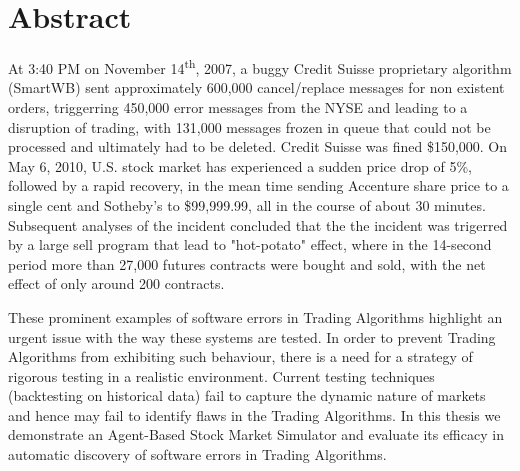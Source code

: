 \chapter*{Abstract}
At 3:40 PM on November 14\textsuperscript{th}, 2007, a buggy Credit Suisse proprietary algorithm (SmartWB) sent approximately 600,000 cancel/replace messages for non existent orders, triggerring 450,000 error messages from the NYSE and leading to a disruption of trading, with 131,000 messages frozen in queue that could not be processed and ultimately had to be deleted. Credit Suisse was fined \$150,000. On May 6, 2010, U.S. stock market has experienced a sudden price drop of 5\%, followed by a rapid recovery, in the mean time sending Accenture share price to a single cent and Sotheby’s to \$99,999.99, all in the course of about 30 minutes. Subsequent analyses of the incident concluded that the the incident was trigerred by a large sell program that lead to "hot-potato" effect, where in the 14-second period more than 27,000 futures contracts were bought and sold, with the net effect of only around 200 contracts. \cite{Kirilenko2011}

These prominent examples of software errors in Trading Algorithms highlight an urgent issue with the way these systems are tested. In order to prevent Trading Algorithms from exhibiting such behaviour, there is a need for a strategy of rigorous testing in a realistic environment. Current testing techniques (backtesting on historical data) fail to capture the dynamic nature of markets and hence may fail to identify flaws in the Trading Algorithms. In this thesis we demonstrate an Agent-Based Stock Market Simulator and evaluate its efficacy in automatic discovery of software errors in Trading Algorithms.
\vfill